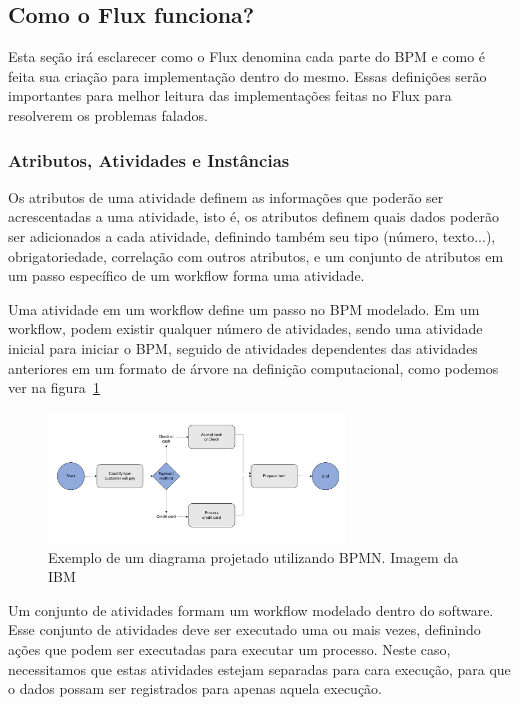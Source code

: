 \subsection{Como o Flux funciona?}

Esta seção irá esclarecer como o Flux denomina cada parte do BPM e como é feita sua criação para implementação dentro do mesmo. Essas definições serão importantes para melhor leitura das implementações feitas no Flux para resolverem os problemas falados.

\subsubsection{Atributos, Atividades e Instâncias}

Os atributos de uma atividade definem as informações que poderão ser acrescentadas a uma atividade, isto é, os atributos definem quais dados poderão ser adicionados a cada atividade, definindo também seu tipo (número, texto...), obrigatoriedade, correlação com outros atributos, e um conjunto de atributos em um passo específico de um workflow forma uma atividade.

Uma atividade em um workflow define um passo no BPM modelado. Em um workflow, podem existir qualquer número de atividades, sendo uma atividade inicial para iniciar o BPM, seguido de atividades dependentes das atividades anteriores em um formato de árvore na definição computacional, como podemos ver na figura~\ref{fig:bpmn_diagram}

\begin{figure}
    \centering
    \includegraphics[width=0.7\textwidth]{imgs/BPM/bpmn_diagram.png}
    \caption{Exemplo de um diagrama projetado utilizando BPMN. Imagem da IBM~\cite{TheIBM}}
    \label{fig:bpmn_diagram}
\end{figure}

Um conjunto de atividades formam um workflow modelado dentro do software. Esse conjunto de atividades deve ser executado uma ou mais vezes, definindo ações que podem ser executadas para executar um processo. Neste caso, necessitamos que estas atividades estejam separadas para cara execução, para que o dados possam ser registrados para apenas aquela execução.

